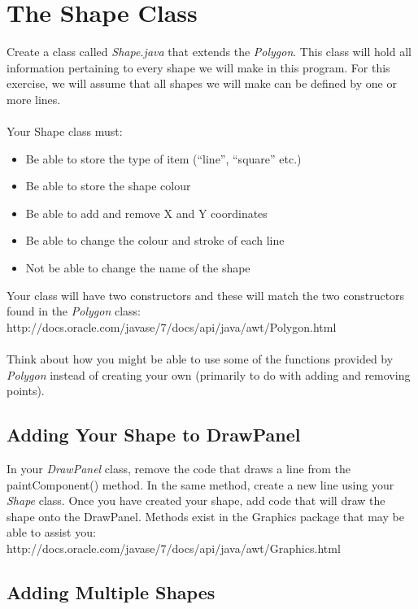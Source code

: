\documentclass[a4paper,12pt]{article}
\begin{document}
\section{The Shape Class}
Create a class called \textit{Shape.java} that extends the \textit{Polygon}. This class will hold all information pertaining to every shape we will make in this program. For this exercise, we will assume that all shapes we will make can be defined by one or more lines.\\
\\
Your Shape class must:
\begin{itemize}
\item Be able to store the type of item (``line'', ``square'' etc.)
\item Be able to store the shape colour
\item Be able to add and remove X and Y coordinates
\item Be able to change the colour and stroke of each line
\item Not be able to change the name of the shape
\end{itemize}
Your class will have two constructors and these will match the two constructors found in the \textit{Polygon} class:\\

http://docs.oracle.com/javase/7/docs/api/java/awt/Polygon.html\\
\\
Think about how you might be able to use some of the functions provided by \textit{Polygon} instead of creating your own (primarily to do with adding and removing points).

\subsection{Adding Your Shape to DrawPanel}
In your \textit{DrawPanel} class, remove the code that draws a line from the paintComponent() method. In the same method, create a new line using your \textit{Shape} class. Once you have created your shape, add code that will draw the shape onto the DrawPanel. Methods exist in the Graphics package that may be able to assist you:\\

http://docs.oracle.com/javase/7/docs/api/java/awt/Graphics.html

\subsection{Adding Multiple Shapes}
\end{document}
